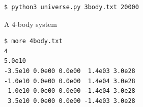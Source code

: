 \documentclass[8pt,a4paper,compress]{beamer}
\begin{document}
\begin{frame}[fragile]
\begin{minipage}{200pt}
\begin{lstlisting}[language={},style=focusin]
$ python3 universe.py 3body.txt 20000
\end{lstlisting}
\end{minipage}%
\hfill
\begin{minipage}{100pt}
\begin{center}
\end{center}
\end{minipage}

\pause
\smallskip

\begin{minipage}{200pt}
A 4-body system
\begin{lstlisting}[language={},style=focusin]
$ more 4body.txt
4 
5.0e10 
-3.5e10 0.0e00 0.0e00  1.4e03 3.0e28 
-1.0e10 0.0e00 0.0e00  1.4e04 3.0e28 
 1.0e10 0.0e00 0.0e00 -1.4e04 3.0e28 
 3.5e10 0.0e00 0.0e00 -1.4e03 3.0e28 
\end{lstlisting}


\end{minipage}
\end{frame}
\end{document}
